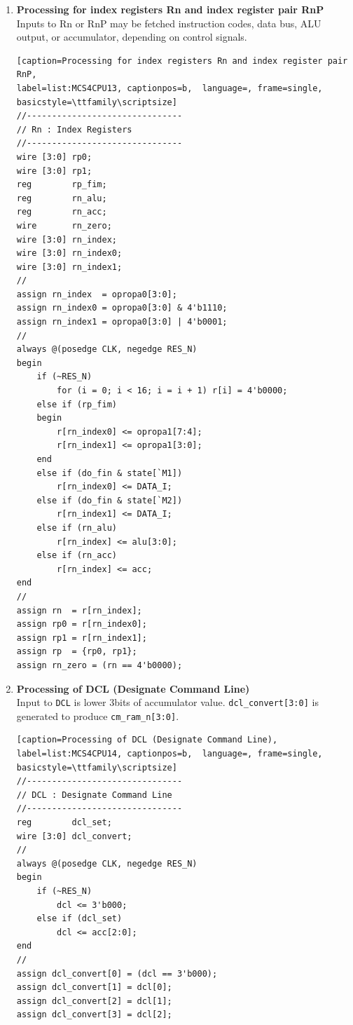 \begin{enumerate}[(1)]
\item \textbf{Processing for index registers Rn and index register pair RnP}\\
Inputs to Rn or RnP may be fetched instruction codes, data bus, ALU output, or accumulator, depending on control signals.
\\
\begin{lstlisting}[caption=Processing for index registers Rn and index register pair RnP, 
label=list:MCS4CPU13, captionpos=b,  language=, frame=single, basicstyle=\ttfamily\scriptsize]
//-------------------------------
// Rn : Index Registers
//-------------------------------
wire [3:0] rp0;
wire [3:0] rp1;
reg        rp_fim;
reg        rn_alu;
reg        rn_acc;
wire       rn_zero;
wire [3:0] rn_index;
wire [3:0] rn_index0;
wire [3:0] rn_index1;
//
assign rn_index  = opropa0[3:0];
assign rn_index0 = opropa0[3:0] & 4'b1110;
assign rn_index1 = opropa0[3:0] | 4'b0001;
//
always @(posedge CLK, negedge RES_N)
begin
    if (~RES_N)
        for (i = 0; i < 16; i = i + 1) r[i] = 4'b0000;
    else if (rp_fim)
    begin
        r[rn_index0] <= opropa1[7:4];
        r[rn_index1] <= opropa1[3:0];
    end
    else if (do_fin & state[`M1])
        r[rn_index0] <= DATA_I;
    else if (do_fin & state[`M2])
        r[rn_index1] <= DATA_I;
    else if (rn_alu)
        r[rn_index] <= alu[3:0];
    else if (rn_acc)
        r[rn_index] <= acc;
end
//
assign rn  = r[rn_index];
assign rp0 = r[rn_index0];
assign rp1 = r[rn_index1];
assign rp  = {rp0, rp1};
assign rn_zero = (rn == 4'b0000);
\end{lstlisting}

\item \textbf{Processing of DCL (Designate Command Line)}\\
Input to \verb|DCL| is lower 3bits of accumulator value. \verb|dcl_convert[3:0]| is generated to produce \verb|cm_ram_n[3:0]|.
\\
\begin{lstlisting}[caption=Processing of DCL (Designate Command Line), 
label=list:MCS4CPU14, captionpos=b,  language=, frame=single, basicstyle=\ttfamily\scriptsize]
//-------------------------------
// DCL : Designate Command Line
//-------------------------------
reg        dcl_set;
wire [3:0] dcl_convert;
//
always @(posedge CLK, negedge RES_N)
begin
    if (~RES_N)
        dcl <= 3'b000;
    else if (dcl_set)
        dcl <= acc[2:0];
end
//
assign dcl_convert[0] = (dcl == 3'b000);
assign dcl_convert[1] = dcl[0];
assign dcl_convert[2] = dcl[1];
assign dcl_convert[3] = dcl[2];
\end{lstlisting}


\end{enumerate}
